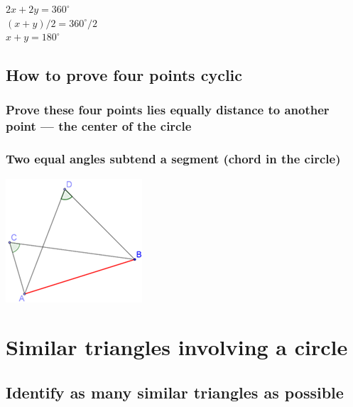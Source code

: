 \documentclass{article}
\begin{document}
\begin{minipage}{0.2\linewidth}

\end{minipage}
\hfill
\begin{minipage}{0.6\linewidth}
$2x+2y=360^\circ$\\
$(x+y)/2=360^\circ /2$\\
$x+y=180^\circ$
\end{minipage}
\subsection{How to prove four points cyclic}

\subsubsection{Prove these four points lies equally distance to another point — the center of the circle}

\subsubsection{Two equal angles subtend a segment (chord in the circle)}

\includegraphics{Picture10.png}

\pagebreak

\section{Similar triangles involving a circle}

\subsection{Identify as many similar triangles as possible}
\end{document}
